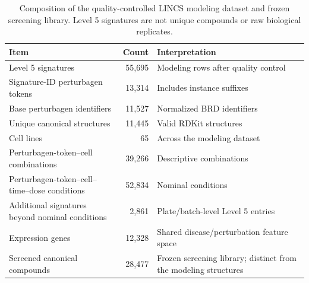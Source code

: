 \begingroup
\small
\begin{table}[H]
\centering
\caption{Composition of the quality-controlled LINCS modeling dataset and frozen screening library. Level 5 signatures are not unique compounds or raw biological replicates.}
\label{tab:s_dataset}
\begin{tabular}{@{}p{}rp{}@{}}
\toprule
Item & Count & Interpretation \\
\midrule
Level 5 signatures & 55,695 & Modeling rows after quality control \\
Signature-ID perturbagen tokens & 13,314 & Includes instance suffixes \\
Base perturbagen identifiers & 11,527 & Normalized BRD identifiers \\
Unique canonical structures & 11,445 & Valid RDKit structures \\
Cell lines & 65 & Across the modeling dataset \\
Perturbagen-token--cell combinations & 39,266 & Descriptive combinations \\
Perturbagen-token--cell--time--dose conditions & 52,834 & Nominal conditions \\
Additional signatures beyond nominal conditions & 2,861 & Plate/batch-level Level 5 entries \\
Expression genes & 12,328 & Shared disease/perturbation feature space \\
Screened canonical compounds & 28,477 & Frozen screening library; distinct from the modeling structures \\
\bottomrule
\end{tabular}
\end{table}
\endgroup
